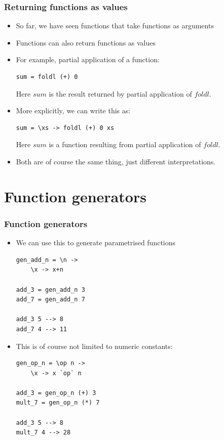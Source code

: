\documentclass{beamer}
\begin{document}
\begin{frame}[fragile]
\frametitle{Returning functions as values}

\begin{itemize}
\item So far, we have seen functions that take functions as arguments
\item Functions can also return  functions as values
\item For example, partial application of a function:

\begin{verbatim}
sum = foldl (+) 0
\end{verbatim}

Here $sum$ is the result returned by  partial application of $foldl$.

\item More explicitly, we can write this as:

\begin{verbatim}
sum = \xs -> foldl (+) 0 xs
\end{verbatim}

Here $sum$ is a function resulting from partial application of $foldl$.

\item Both are of course the same thing, just different interpretations.
\end{itemize}
\end{frame}


\section{Function generators}

\begin{frame}[fragile]
\frametitle{Function generators}

\begin{itemize}
\item We can use this to generate parametrised functions

\begin{verbatim}
gen_add_n = \n ->
    \x -> x+n
	
add_3 = gen_add_n 3	
add_7 = gen_add_n 7

add_3 5 --> 8
add_7 4 --> 11
\end{verbatim}

\item This is of course not limited to numeric constants:

\begin{verbatim}
gen_op_n = \op n ->
    \x -> x `op` n
	
add_3 = gen_op_n (+) 3	
mult_7 = gen_op_n (*) 7

add_3 5 --> 8
mult_7 4 --> 28
\end{verbatim}

\end{itemize}
\end{frame}
\end{document}
